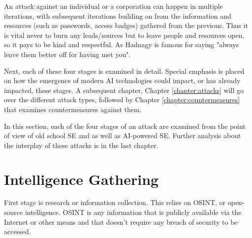 An attack against an individual or a corporation can happen in multiple iterations, with subsequent iterations building on from the information and resources (such as passwords, access badges) gathered from the previous. Thus it is vital never to burn any leads/sources but to leave people and resources open, so it pays to be kind and respectful. As Hadnagy is famous for saying "always leave them better off for having met you".

Next, each of these four stages is examined in detail. Special emphasis is placed on how the emergence of modern AI technologies could impact, or has already impacted, these stages. A subsequent chapter, Chapter \ref{chapter:attacks} will go over the different attack types, followed by Chapter \ref{chapter:countermeasures} that examines countermeasures against them.

In this section, each of the four stages of an attack are examined from the point of view of old school SE and as well as AI-powered SE. Further analysis about the interplay of these attacks is in the last chapter.





\section{Intelligence Gathering}
\begin{comment}
    
    - OSINT has been defined in a preceending chapter
    - Cover the phase of intel gathering more broadly than just OSINT
    - Following and observing people entering and exiting premises
    - Calling the company for more information (after OSINT)
    - Use of pretexting in intel gathering
    - Gather info, understand vulnerabilities, habits, potential entry/exit points
    - Company website, social media profiles (inlc. old), public info e.g. from corporate databases (YTJ)
    - Physical surveillance of targets
    - AI can augment data collection and analysis (inc big amounts of data), increases speed of intel gathering and the attack itself
    - NLP may help in parsing the info

\end{comment}


First stage is research or information collection. This relies on OSINT, or open-source intelligence. OSINT is any information that is publicly available via the Internet or other means and that doesn't require any breach of security to be accessed.

